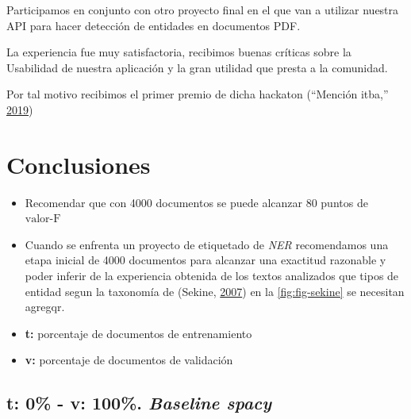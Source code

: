 \documentclass[12pt,a4paper,]{scrartcl}
\providecommand{\tightlist}{%
  \setlength{\itemsep}{0pt}\setlength{\parskip}{0pt}}
\begin{document}
Participamos en conjunto con otro proyecto final en el que van a utilizar nuestra API para hacer detección de entidades en documentos PDF.

La experiencia fue muy satisfactoria, recibimos buenas críticas sobre la Usabilidad de nuestra aplicación y la gran utilidad que presta a la comunidad.

Por tal motivo recibimos el primer premio de dicha hackaton (``Mención itba,'' \protect\hyperlink{ref-mediaparty2019_win}{2019})

\newpage

\hypertarget{conclusiones}{%
\section{Conclusiones}\label{conclusiones}}

\begin{itemize}
\item
  Recomendar que con 4000 documentos se puede alcanzar 80 puntos de \(\text{valor-F}\)
\item
  Cuando se enfrenta un proyecto de etiquetado de \emph{NER} recomendamos una etapa inicial de 4000 documentos para alcanzar una exactitud razonable y poder inferir de la experiencia obtenida de los textos analizados que tipos de entidad segun la taxonomía de (Sekine, \protect\hyperlink{ref-Sekine-NER}{2007}) en la \ref{fig:fig-sekine} se necesitan agregqr.
\end{itemize}

\newpage

\hypertarget{appendix-anexo-datos-de-resultados}{%
\appendix}


\begin{itemize}
\tightlist
\item
  \textbf{t:} porcentaje de documentos de entrenamiento
\item
  \textbf{v:} porcentaje de documentos de validación
\end{itemize}

\hypertarget{t-0---v-100.-baseline-spacy}{%
\subsection{\texorpdfstring{t: 0\% - v: 100\%. \emph{Baseline spacy}}{t: 0\% - v: 100\%. Baseline spacy}}\label{t-0---v-100.-baseline-spacy}}
\end{document}
